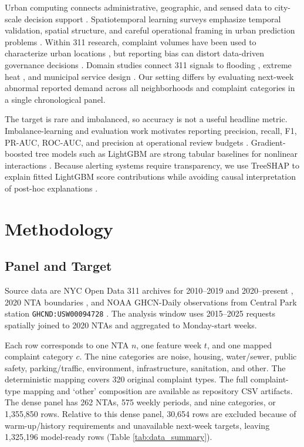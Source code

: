 \documentclass[pdflatex,sn-mathphys-num]{sn-jnl}
\begin{document}
Urban computing connects administrative, geographic, and sensed data to city-scale decision support \cite{Zheng2014UrbanComputing}. Spatiotemporal learning surveys emphasize temporal validation, spatial structure, and careful operational framing in urban prediction problems \cite{Jin2024STGNNSurvey}. Within 311 research, complaint volumes have been used to characterize urban locations \cite{Wang2017Structure311}, but reporting bias can distort data-driven governance decisions \cite{KontokostaHong2021Bias}. Domain studies connect 311 signals to flooding \cite{Agonafir2022Flooding311}, extreme heat \cite{KianmehrPamukcu2022Heat311}, and municipal service design \cite{LiuGarg2024SLA}. Our setting differs by evaluating next-week abnormal reported demand across all neighborhoods and complaint categories in a single chronological panel.

The target is rare and imbalanced, so accuracy is not a useful headline metric. Imbalance-learning and evaluation work motivates reporting precision, recall, F1, PR-AUC, ROC-AUC, and precision at operational review budgets \cite{HeGarcia2009Imbalanced,Fawcett2006ROC,DavisGoadrich2006PRROC,SaitoRehmsmeier2015PR}. Gradient-boosted tree models such as LightGBM are strong tabular baselines for nonlinear interactions \cite{Ke2017LightGBM}. Because alerting systems require transparency, we use TreeSHAP to explain fitted LightGBM score contributions while avoiding causal interpretation of post-hoc explanations \cite{LundbergLee2017SHAP,Lundberg2020TreeSHAP,Rudin2019InterpretableML}.

\section{Methodology}\label{sec:method}

\subsection{Panel and Target}\label{subsec:panel_target}

Source data are NYC Open Data 311 archives for 2010--2019 and 2020--present \cite{NYC311HistoricalOpenData,NYC311OpenData}, 2020 NTA boundaries \cite{NYCNTA2020}, and NOAA GHCN-Daily observations from Central Park station \texttt{GHCND:USW00094728} \cite{Menne2012GHCND}. The analysis window uses 2015--2025 requests spatially joined to 2020 NTAs and aggregated to Monday-start weeks.

Each row corresponds to one NTA \(n\), one feature week \(t\), and one mapped complaint category \(c\). The nine categories are noise, housing, water/sewer, public safety, parking/traffic, environment, infrastructure, sanitation, and other. The deterministic mapping covers 320 original complaint types. The full complaint-type mapping and `other' composition are available as repository CSV artifacts. The dense panel has 262 NTAs, 575 weekly periods, and nine categories, or 1,355,850 rows. Relative to this dense panel, 30,654 rows are excluded because of warm-up/history requirements and unavailable next-week targets, leaving 1,325,196 model-ready rows (Table \ref{tab:data_summary}).
\end{document}

